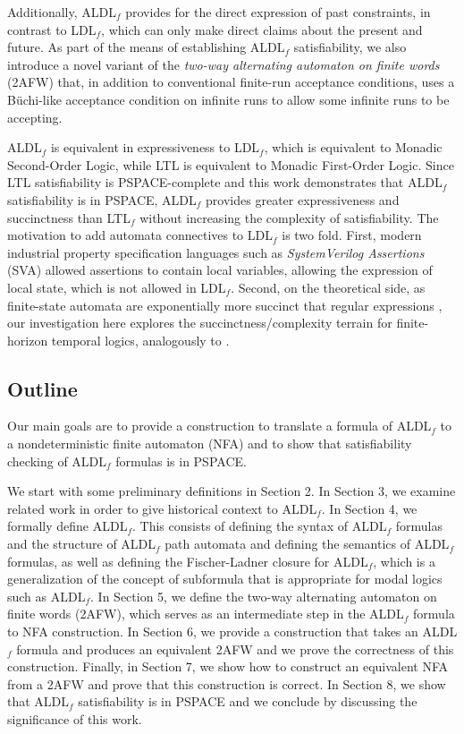 \documentclass{lmcs}
\theoremstyle{definition}
\DeclareMathOperator{\?}{?}
\begin{document}
Additionally, ALDL$_f$ provides for the direct expression of past constraints, in contrast to LDL$_f$, which can only make direct claims about the present and future. As part of the means of establishing ALDL$_f$ satisfiability, we also introduce a novel variant of the \textit{two-way alternating automaton on finite words} (2AFW) that, in addition to conventional finite-run acceptance conditions, uses a B\"uchi-like acceptance condition on infinite runs to allow some infinite runs to be accepting.

ALDL$_f$ is equivalent in expressiveness to LDL$_f$, which is equivalent to Monadic Second-Order Logic, while LTL is equivalent to Monadic First-Order Logic. Since LTL satisfiability is PSPACE-complete and this work demonstrates that ALDL$_f$ satisfiability is in PSPACE, ALDL$_f$ provides greater expressiveness and succinctness than LTL$_f$ without increasing the complexity of satisfiability.
The motivation to add automata connectives to LDL$_f$ is two fold.
First, modern industrial property specification languages such as \emph{SystemVerilog Assertions} (SVA) allowed assertions to contain local variables, allowing the expression of local state, which is not allowed in LDL$_f$. Second, on the theoretical side, as finite-state automata are exponentially more succinct that regular expressions \cite{gruber2}, our investigation here explores the succinctness/complexity terrain for finite-horizon temporal logics, analogously to \cite{vardi-wolper}.

\subsection{Outline}

Our main goals are to provide a construction to translate a formula of ALDL$_f$ to a nondeterministic finite automaton (NFA) and to show that satisfiability checking of ALDL$_f$ formulas is in PSPACE.

We start with some preliminary definitions in Section 2. In Section 3, we examine related work in order to give historical context to ALDL$_f$. In Section 4, we formally define ALDL$_f$. This consists of defining the syntax of ALDL$_f$ formulas and the structure of ALDL$_f$ path automata and defining the semantics of ALDL$_f$ formulas, as well as defining the Fischer-Ladner closure for ALDL$_f$, which is a generalization of the concept of subformula that is appropriate for modal logics such as ALDL$_f$. In Section 5, we define the two-way alternating automaton on finite words (2AFW), which serves as an intermediate step in the ALDL$_f$ formula to NFA construction. In Section 6, we provide a construction that takes an ALDL$_f$ formula and produces an equivalent 2AFW and we prove the correctness of this construction. Finally, in Section 7, we show how to construct an equivalent NFA from a 2AFW and prove that this construction is correct. In Section 8, we show that ALDL$_f$ satisfiability is in PSPACE and we conclude by discussing the significance of this work.
\end{document}
